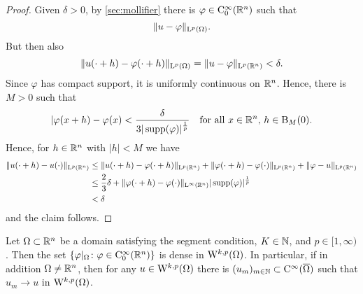 \begin{proof}
  Given $\delta > 0$, by \ref{sec:mollifier} there is $\varphi \in \mathrm{C}_0^\infty(\mathbb{R}^n)$ such that
  $$
  \|u - \varphi\|_{\mathrm{L}^p(\Omega)}.
  $$
  But then also
  $$
  \|u(\cdot + h) - \varphi(\cdot + h) \|_{\mathrm{L}^p(\Omega)} = \|u - \varphi\|_{\mathrm{L}^p(\mathbb{R}^n)} < \delta.
  $$
  Since $\varphi$ has compact support, it is uniformly continuous on $\mathbb{R}^n$.
  Hence, there is $M > 0$ such that
  $$
  |\varphi(x + h) - \varphi(x) < \frac{\delta}{3|\operatorname{supp}(\varphi)|^{\frac{1}{p}}} \quad\text{for all } x \in \mathbb{R}^n\text{, } h \in \mathrm{B}_M(0).
  $$
  Hence, for $h \in \mathbb{R}^n$ with $|h| < M$ we have
  \begin{align*}
    \|u(\cdot + h) - u(\cdot)\|_{\mathrm{L}^p(\mathbb{R}^n)}
    &\leq \|u(\cdot + h) - \varphi(\cdot + h) \|_{\mathrm{L}^p(\mathbb{R}^n)} + \|\varphi(\cdot + h) - \varphi(\cdot ) \|_{\mathrm{L}^p(\mathbb{R}^n)} +  \|\varphi - u \|_{\mathrm{L}^p(\mathbb{R}^n)} \\
    &\leq \frac{2}{3}\delta +  \|\varphi(\cdot + h) - \varphi(\cdot)\|_{\mathrm{L}^\infty(\mathbb{R}^n)} |\operatorname{supp}(\varphi)|^{\frac{1}{p}} \\
    &< \delta
  \end{align*}
  and the claim follows.
\end{proof}

\begin{thm}
  \label{thm:CinftyUpToBoundary}
  Let $\Omega \subset \mathbb{R}^n$ be a domain satisfying the segment condition, $K \in \mathbb{N}$, and $p \in [1,\infty)$.
    Then the set 
    $
    \{ \varphi|_\Omega \colon \varphi \in \mathrm{C}_0^\infty(\mathbb{R}^n) \}
    $
    is dense in $\mathrm{W}^{k,p}(\Omega)$.
    In particular, if in addition $\Omega \neq \mathbb{R}^n$, then for any $u \in \mathrm{W}^{k,p}(\Omega)$ there is $(u_m)_{m \in \mathbb{N}} \subset \mathrm{C}^\infty(\overline \Omega)$ such that $u_m \to u$ in $\mathrm{W}^{k,p}(\Omega)$.
\end{thm}

